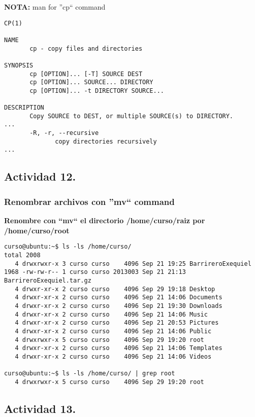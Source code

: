 \documentclass[a4paper,11pt,spanish]{article} %
\newenvironment{myscriptlisting}
{\begin{list}{}{\setlength{\leftmargin}{1em}}\item\scriptsize\bfseries}
{\end{list}}
\begin{document}
\textbf{NOTA:}
man for ''cp`` command

\begin{verbatim}
CP(1)                                                                      

NAME
       cp - copy files and directories

SYNOPSIS
       cp [OPTION]... [-T] SOURCE DEST
       cp [OPTION]... SOURCE... DIRECTORY
       cp [OPTION]... -t DIRECTORY SOURCE...

DESCRIPTION
       Copy SOURCE to DEST, or multiple SOURCE(s) to DIRECTORY.
...       
       -R, -r, --recursive
              copy directories recursively
...
\end{verbatim}

\subsection{Actividad 12.}

\subsubsection{Renombrar archivos con ''mv`` command}
\textbf{Renombre con ``mv`` el directorio /home/curso/raiz por /home/curso/root}

\begin{myscriptlisting}
 \begin{verbatim}
curso@ubuntu:~$ ls -ls /home/curso/
total 2008
   4 drwxrwxr-x 3 curso curso    4096 Sep 21 19:25 BarrireroExequiel
1968 -rw-rw-r-- 1 curso curso 2013003 Sep 21 21:13 BarrireroExequiel.tar.gz
   4 drwxr-xr-x 2 curso curso    4096 Sep 29 19:18 Desktop
   4 drwxr-xr-x 2 curso curso    4096 Sep 21 14:06 Documents
   4 drwxr-xr-x 2 curso curso    4096 Sep 21 19:30 Downloads
   4 drwxr-xr-x 2 curso curso    4096 Sep 21 14:06 Music
   4 drwxr-xr-x 2 curso curso    4096 Sep 21 20:53 Pictures
   4 drwxr-xr-x 2 curso curso    4096 Sep 21 14:06 Public
   4 drwxrwxr-x 5 curso curso    4096 Sep 29 19:20 root
   4 drwxr-xr-x 2 curso curso    4096 Sep 21 14:06 Templates
   4 drwxr-xr-x 2 curso curso    4096 Sep 21 14:06 Videos

curso@ubuntu:~$ ls -ls /home/curso/ | grep root
   4 drwxrwxr-x 5 curso curso    4096 Sep 29 19:20 root
 \end{verbatim}
\end{myscriptlisting}


\subsection{Actividad 13.}
\end{document}
